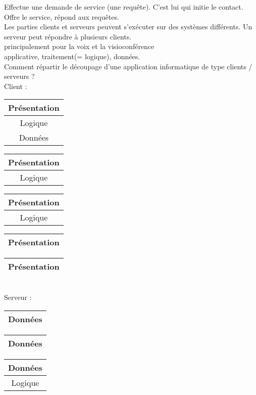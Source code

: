  Effectue une demande de service (une requête). C'est lui qui initie le contact.\\
 Offre le service, répond aux requêtes. \\
 Les parties clients et serveurs peuvent s'exécuter sur des systèmes différents. Un serveur peut répondre à plusieurs clients. \\
 principalement pour la voix et la visioconférence \\
 applicative, traitement(= logique), données. \\
 Comment répartir le découpage d'une application informatique de type clients / serveurs ?
 \\
Client :
\begin{tabular}{|c|}
Présentation \\ \hline Logique \\ \hline Données \\ \hline
\end{tabular}
\begin{tabular}{|c|}
Présentation \\ \hline Logique \\ \hline
\end{tabular}
\begin{tabular}{|c|}
Présentation \\ \hline Logique \\ \hline
\end{tabular}
\begin{tabular}{|c|}
Présentation \\ \hline 
\end{tabular}
\begin{tabular}{|c|}
Présentation \\ \hline
\end{tabular}
\\
Serveur :
\begin{tabular}{|c|}
Données \\ \hline
\end{tabular}
\begin{tabular}{|c|}
Données \\ \hline
\end{tabular}
\begin{tabular}{|c|}
Données \\ \hline Logique \\ \hline
\end{tabular}
